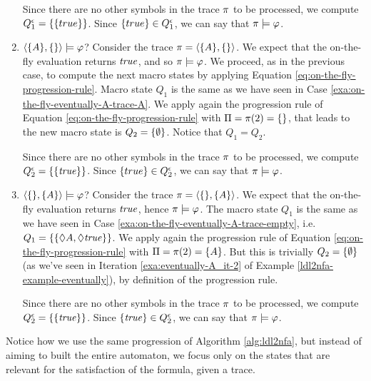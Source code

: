 \begin{example}
\begin{enumerate}
		Since there are no other symbols in the trace $\pi$ to be processed, we compute $Q_1^\epsilon = \{\{true\}\}$. Since $\{true\} \in Q_1^\epsilon$, we can say that $\pi \models \varphi$.\label{exa:on-the-fly-eventually-A-trace-A}
		
		\item $\langle \{A\}, \{\} \rangle \models \varphi$? Consider the trace $\pi = \langle \{A\}, \{\} \rangle$. We expect that the on-the-fly evaluation returns $\mathit{true}$, and so $\pi \models \varphi$. We proceed, as in the previous case, to compute the next macro states by applying Equation \ref{eq:on-the-fly-progression-rule}. Macro state $Q_1$ is the same as we have seen in Case \ref{exa:on-the-fly-eventually-A-trace-A}. 
		We apply again the progression rule of Equation \ref{eq:on-the-fly-progression-rule} with $\Pi = \pi(2) = \{\}$, that leads to the new macro state is $Q_2 = \{\emptyset\}$. Notice that $Q_1 = Q_2$.
		
		Since there are no other symbols in the trace $\pi$ to be processed, we compute $Q_2^\epsilon = \{\{\mathit{true}\}\}$. Since $\{true\} \in Q_2^\epsilon$, we can say that $\pi \models \varphi$.
		
		\item $\langle \{\}, \{A\} \rangle \models \varphi$? Consider the trace $\pi = \langle \{\}, \{A\} \rangle$. We expect that the on-the-fly evaluation returns $\mathit{true}$, hence $\pi \models \varphi$. The macro state $Q_1$ is the same as we have seen in Case \ref{exa:on-the-fly-eventually-A-trace-empty}, i.e. $Q_1 = \{\{\Diamond A, \Diamond \mathit{true}\}\}$. 
		We apply again the progression rule of Equation \ref{eq:on-the-fly-progression-rule} with $\Pi = \pi(2) = \{A\}$. But this is trivially $Q_2 = \{\emptyset\}$ (as we've seen in Iteration \ref{exa:eventually-A_it-2} of Example \ref{ldl2nfa-example-eventually}), by definition of the progression rule.
		
		Since there are no other symbols in the trace $\pi$ to be processed, we compute $Q_2^\epsilon = \{\{\mathit{true}\}\}$. Since $\{\mathit{true}\} \in Q_2^\epsilon$, we can say that $\pi \models \varphi$.
		
	\end{enumerate}	
	Notice how we use the same progression  of Algorithm \ref{alg:ldl2nfa}, but instead of aiming to built the entire automaton, we focus only on the states that are relevant for the satisfaction of the formula, given a trace.
	
\end{example}

